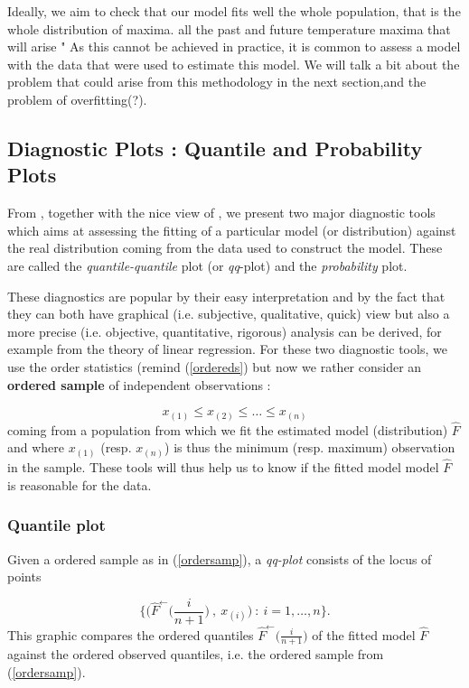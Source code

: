 \documentclass[11pt,a4paper,openany ]{book}
\begin{document}
Ideally, we aim to check that our model fits well the whole population, that is the whole distribution of maxima. all the past and future temperature maxima that will arise " As this cannot be achieved in practice, it is common to assess a model with the data that were used to estimate this model. We will talk a bit about the problem that could arise from this methodology in the next section,and the problem of overfitting(?).



\subsection{Diagnostic Plots : Quantile and Probability Plots}
From \citet[pp.18-36]{beirlant_practical_1996}, together with the nice view of \citet[pp.36-37]{coles_introduction_2001}, we present two major diagnostic tools which aims at assessing the fitting of a particular model (or distribution) against the real distribution coming from the data used to construct the model.
These are called the \emph{quantile-quantile} plot (or \emph{qq}-plot) and the \emph{probability} plot. 

These diagnostics are popular by their easy interpretation and by the fact that they can both have graphical (i.e. subjective, qualitative, quick) view but also a more precise (i.e. objective, quantitative, rigorous) analysis can be derived, for example from the theory of linear regression. 
\newline
For these two diagnostic tools, we use the order statistics (remind (\ref{ordereds}) but now we rather consider an \textbf{ordered sample} of independent observations :

\begin{equation} \label{ordersamp}
x_{(1)}\leq x_{(2)}\leq\dots\leq x_{(n)}
\end{equation}
coming from a population from which we fit the estimated model (distribution) $\hat{F}$ and where $x_{(1)}$ (resp. $x_{(n)}$) is thus the minimum (resp. maximum) observation in the sample. These tools will thus help us to know if the fitted model model $\hat{F}$ is reasonable for the data.

\subsubsection*{Quantile plot} Given a ordered sample as in (\ref{ordersamp}), a \emph{qq-plot} consists of the locus of points 

\begin{equation}
\Bigg\{\bigg(\hat{F}^{\leftarrow}\Big(\frac{i}{n+1}\Big)\ ,\ x_{(i)}\bigg) \ : \ i=1,\dots,n\Bigg\}.
\end{equation}
This graphic compares the ordered quantiles $\hat{F}^{\leftarrow}\Big(\frac{i}{n+1}\Big)$ of the fitted model $\hat{F}$ against the ordered observed quantiles, i.e. the ordered sample from (\ref{ordersamp}).
\end{document}
